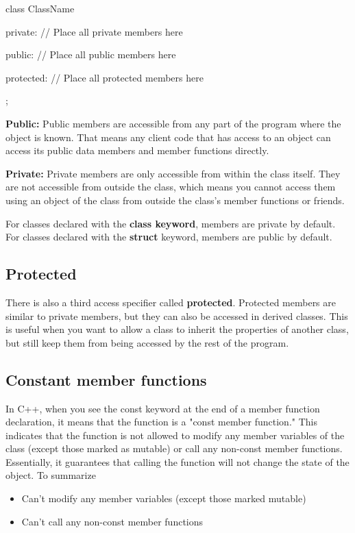 \documentclass{report}
\begin{document}
    \begin{cppcode}
class ClassName {
    private:
        // Place all private members here

    public: 
        // Place all public members here

    protected:
        // Place all protected members here
};
    \end{cppcode}
    
    \bigbreak \noindent 
    \textbf{Public:}
    \bigbreak \noindent 
    Public members are accessible from any part of the program where the object is known. That means any client code that has access to an object can access its public data members and member functions directly.

    \bigbreak \noindent 
    \textbf{Private:}
    \bigbreak \noindent 
    Private members are only accessible from within the class itself. They are not accessible from outside the class, which means you cannot access them using an object of the class from outside the class's member functions or friends. 
    \bigbreak \noindent 
    \begin{notebox}
        For classes declared with the \textbf{class keyword}, members are private by default. For classes declared with the \textbf{struct} keyword, members are public by default.
    \end{notebox}
    
    \bigbreak \noindent 
    \subsection{Protected}
    \bigbreak \noindent 
    There is also a third access specifier called \textbf{protected}. Protected members are similar to private members, but they can also be accessed in derived classes. This is useful when you want to allow a class to inherit the properties of another class, but still keep them from being accessed by the rest of the program.

    \bigbreak \noindent 
    \subsection{Constant member functions} 
    \bigbreak \noindent 
    In C++, when you see the const keyword at the end of a member function declaration, it means that the function is a "const member function." This indicates that the function is not allowed to modify any member variables of the class (except those marked as mutable) or call any non-const member functions. Essentially, it guarantees that calling the function will not change the state of the object. To summarize
    \begin{itemize}
        \item Can't modify any member variables (except those marked mutable)
        \item Can't call any non-const member functions
    \end{itemize}
\end{document}
